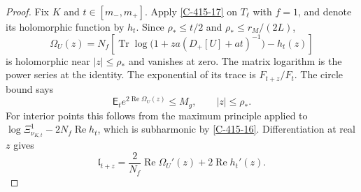 \documentclass[11pt,letterpaper,reqno]{amsart}
\theoremstyle{definition}
\theoremstyle{remark}
\begin{document}
\begin{proof}
Fix $K$ and $t\in[m_-,m_+]$. Apply \cref{C-415-17} on
$T_\ell$ with $f=1$, and denote its holomorphic function by
$h_t$. Since $\rho_*\le t/2$ and $\rho_*\le r_M/(2L)$,
\[
 \Omega_U(z)=N_f\left[
  \operatorname{Tr}\log\bigl(1+za(D_+[U]+at)^{-1}\bigr)-h_t(z)
                   \right]
\]
is holomorphic near $|z|\le\rho_*$ and vanishes at zero.
The matrix logarithm is the power series at the identity.
The exponential of its trace is $F_{t+z}/F_t$. The circle bound says
\begin{equation}\label{eq:qcdm2-mass-log-moment}
 \mathsf E_t e^{2\operatorname{Re}\Omega_U(z)}\le M_g,
                   \qquad |z|\le\rho_*.
\end{equation}
For interior points this follows from the maximum principle
applied to $\log\Xi_{\nu_{K,t}}^1-2N_f\operatorname{Re}h_t$,
which is subharmonic by \cref{C-415-16}.
Differentiation at real $z$ gives
\begin{equation}\label{eq:qcdm2-mass-loop-derivative}
 \mathfrak l_{t+z}
   =\frac2{N_f}\operatorname{Re}\Omega_U'(z)
                         +2\operatorname{Re}h_t'(z).
\end{equation}


\end{proof}
\end{document}
